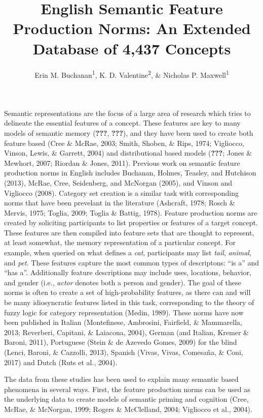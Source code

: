 \documentclass[english,man]{apa6}
\title{English Semantic Feature Production Norms: An Extended Database of 4,437
Concepts}
\author{Erin M. Buchanan\textsuperscript{1}, K. D. Valentine\textsuperscript{2}, \& Nicholas P. Maxwell\textsuperscript{1}}
\affiliation{
    \vspace{0.5cm}
          \textsuperscript{1} Missouri State University\\
          \textsuperscript{2} University of Missouri  }
\theoremstyle{definition}
\theoremstyle{definition}
\theoremstyle{definition}
\theoremstyle{remark}
\begin{document}
\maketitle

\setcounter{secnumdepth}{0}



Semantic representations are the focus of a large area of research which
tries to delineate the essential features of a concept. These features
are key to many models of semantic memory ({\textbf{???}},
{\textbf{???}}), and they have been used to create both feature based
(Cree \& McRae, 2003; Smith, Shoben, \& Rips, 1974; Vigliocco, Vinson,
Lewis, \& Garrett, 2004) and distributional based models
({\textbf{???}}; Jones \& Mewhort, 2007; Riordan \& Jones, 2011).
Previous work on semantic feature production norms in English includes
Buchanan, Holmes, Teasley, and Hutchison (2013), McRae, Cree,
Seidenberg, and McNorgan (2005), and Vinson and Vigliocco (2008).
Category set creation is a similar task with corresponding norms that
have been prevelant in the literature (Ashcraft, 1978; Rosch \& Mervis,
1975; Toglia, 2009; Toglia \& Battig, 1978). Feature production norms
are created by soliciting participants to list properties or features of
a target concept. These features are then compiled into feature sets
that are thought to represent, at least somewhat, the memory
representation of a particular concept. For example, when queried on
what defines a \emph{cat}, participants may list \emph{tail},
\emph{animal}, and \emph{pet}. These features capture the most common
types of descriptons: \enquote{is a} and \enquote{has a}. Additionally
feature descriptions may include uses, locations, behavior, and gender
(i.e., \emph{actor} denotes both a person and gender). The goal of these
norms is often to create a set of high-probability features, as there
can and will be many idiosyncratic features listed in this task,
corresponding to the theory of fuzzy logic for category representation
(Medin, 1989). These norms have now been published in Italian
(Montefinese, Ambrosini, Fairfield, \& Mammarella, 2013; Reverberi,
Capitani, \& Laiacona, 2004), German (and Italian, Kremer \& Baroni,
2011), Portuguese (Stein \& de Azevedo Gomes, 2009) for the blind
(Lenci, Baroni, \& Cazzolli, 2013), Spanish (Vivas, Vivas, Comesaña, \&
Coni, 2017) and Dutch (Ruts et al., 2004).

The data from these studies has been used to explain many semantic based
phenomena in several ways. First, the feature production norms can be
used as the underlying data to create models of semantic priming and
cognition (Cree, McRae, \& McNorgan, 1999; Rogers \& McClelland, 2004;
Vigliocco et al., 2004).
\end{document}
